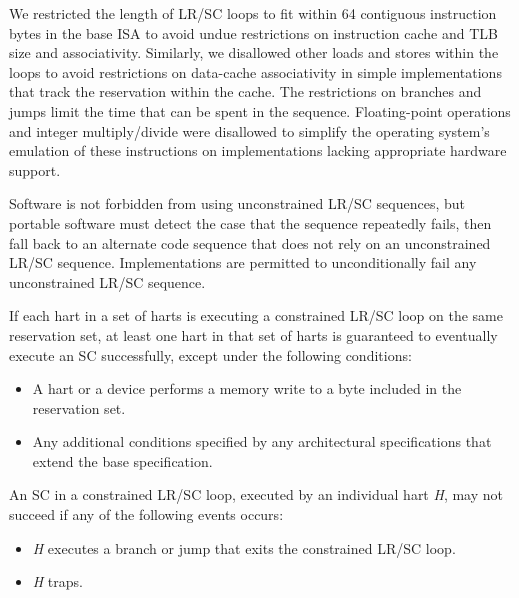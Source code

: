 \begin{commentary}
We restricted the length of LR/SC loops to fit within 64 contiguous
instruction bytes in the base ISA to avoid undue restrictions on instruction
cache and TLB size and associativity.
Similarly, we disallowed other loads and stores within the loops to avoid
restrictions on data-cache associativity in simple implementations that track
the reservation within the cache.
The restrictions on branches and jumps limit the time that
can be spent in the sequence.  Floating-point operations and integer
multiply/divide were disallowed to simplify the operating system's emulation
of these instructions on implementations lacking appropriate hardware support.

Software is not forbidden from using unconstrained LR/SC sequences, but
portable software must detect the case that the sequence repeatedly fails,
then fall back to an alternate code sequence that does not rely on an
unconstrained LR/SC sequence.  Implementations are permitted to
unconditionally fail any unconstrained LR/SC sequence.
\end{commentary}

If each hart in a set of harts is executing a constrained LR/SC loop on the
same reservation set, at least one hart in that set of harts is guaranteed to
eventually execute an SC successfully, except under the following conditions:
\vspace{-0.2in}
\begin{itemize}
\parskip 0pt
\itemsep 1pt
\item A hart or a device performs a memory write to a byte included in the
  reservation set.
\item Any additional conditions specified by any architectural specifications
  that extend the base specification.
\end{itemize}

An SC in a constrained LR/SC loop, executed by an individual hart {\em H}, may
not succeed if any of the following events occurs:
\vspace{-0.2in}
\begin{itemize}
\parskip 0pt
\itemsep 1pt
\item {\em H} executes a branch or jump that exits the constrained LR/SC loop.
\item {\em H} traps.
\end{itemize}

